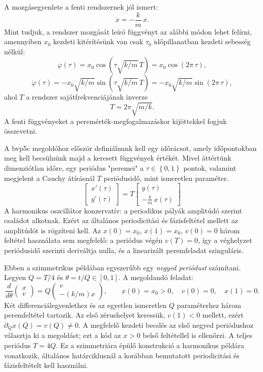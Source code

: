 A mozgásegyenlete a fenti rendszernek jól ismert:
\begin{equation}
\ddot{x}= -\frac{k}{m}\,x.
\end{equation}
Mint tudjuk, a rendszer mozgását leíró függvényt az alábbi módon lehet felírni, amennyiben $x_0$ kezdeti kitérítésünk van csak $\tau_0$ időpillanatban kezdeti sebesség nélkül:
\begin{equation}
\varphi(\tau) = x_0\cos\left(\tau\sqrt{k/m}\,T\right) = x_0\cos\left(2\pi\,\tau\right),
\end{equation}
\begin{equation}
\dot{\varphi}(\tau) = -x_0\sqrt{k/m}\sin\left(\tau\sqrt{k/m}\,T\right) = -x_0\sqrt{k/m}\sin\left(2\pi\,\tau\right),
\end{equation}
ahol $T$ a rendszer sajátfrekvenciájának inverze
\begin{equation}
T = 2\pi\sqrt{m/k}.
\end{equation}
A fenti függvényeket a peremérték-megfogalmazáskor kijöttekkel fogjuk összevetni.

A bvp5c megoldóhoz először definiálnunk kell egy időrácsot, amely i\-dő\-pon\-tok\-ban meg kell becsülnünk majd a keresett függvények értékét.
Mivel áttértünk dimenziótlan időre, egy periódus "peremei" a $\tau \in \left \{ 0,1 \right \}$ pontok, valamint megjelent a Cauchy átírásnál $T$ periódusidő, mint ismeretlen paraméter.
\begin{equation}
\begin{bmatrix}
x'(\tau) \\ y'(\tau)
\end{bmatrix} =
T
\begin{bmatrix}
y(\tau) \\  -\frac{k}{m}\,x(\tau)
\end{bmatrix}
\end{equation}
A harmonikus oszcillátor konzervatív: a periodikus pályák amplitúdó szerint családot alkotnak. Ezért az általános periodicitási és fázisfeltétel mellett az amplitúdót is rögzíteni kell. Az $x(0)=x_0$, $x(1)=x_0$, $v(0)=0$ három feltétel használata sem megfelelő: a periódus végén $v(T)=0$, így a véghelyzet periódusidő szerinti deriváltja nulla, és a linearizált peremfeladat szinguláris.

Ebben a szimmetrikus példában egyszerűbb egy \emph{negyed periódust} számítani. Legyen $Q=T/4$ és $\theta=t/Q\in[0,1]$. A megoldandó feladat:
\[
\frac{d}{d\theta}\begin{pmatrix}x\\v\end{pmatrix}
=Q\begin{pmatrix}v\\-(k/m)x\end{pmatrix},\qquad
x(0)=x_0>0,\quad v(0)=0,\quad x(1)=0.
\]
Két differenciálegyenlethez és az egyetlen ismeretlen $Q$ paraméterhez három peremfeltétel tartozik. Az első zérushelyet keressük, $v(1)<0$ mellett, ezért $\partial_Q x(Q)=v(Q)\neq0$. A megfelelő kezdeti becslés az első negyed periódushoz választja ki a megoldást; ezt a kód az $x>0$ belső feltétellel is ellenőrzi. A teljes periódus $T=4Q$. Ez a szimmetriára épülő konstrukció a harmonikus példára vonatkozik, általános határciklusnál a korábban bemutatott periodicitási és fázisfeltételt kell használni.


